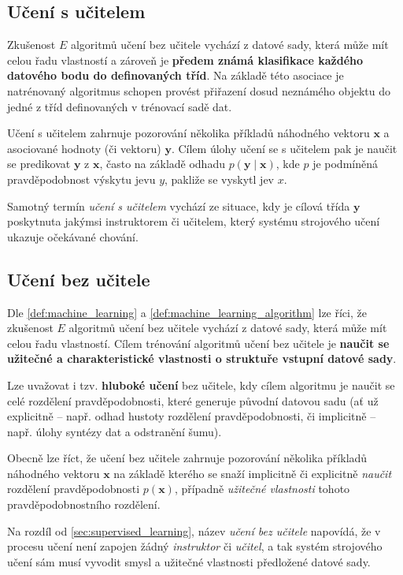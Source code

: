 \subsection{Učení s učitelem}
\label{sec:supervised_learning}
Zkušenost $E$ algoritmů učení bez učitele vychází z datové sady, která může mít celou řadu vlastností a zároveň je \textbf{předem známá klasifikace každého datového bodu do definovaných tříd}.
Na základě této asociace je natrénovaný algoritmus schopen provést přiřazení dosud neznámého objektu do jedné z tříd definovaných v trénovací sadě dat. \cite{Chollet2017}

Učení s učitelem zahrnuje pozorování několika příkladů náhodného vektoru $\mathbf{x}$ a asociované hodnoty (či vektoru) $\mathbf{y}$.
Cílem úlohy učení se s učitelem pak je naučit se predikovat $\mathbf{y}$ z $\mathbf{x}$, často na základě odhadu $p(\mathbf{y}\mid\mathbf{x})$, kde $p$ je podmíněná pravděpodobnost výskytu jevu $y$, pakliže se vyskytl jev $x$. \cite{Goodfellow2016}

Samotný termín \emph{učení s učitelem} vychází ze situace, kdy je cílová třída $\mathbf{y}$ poskytnuta jakýmsi instruktorem či učitelem, který systému strojového učení ukazuje očekávané chování. \cite{Goodfellow2016}
\subsection{Učení bez učitele}
\label{sec:unsupervised_learning}
Dle \autoref{def:machine_learning} a \autoref{def:machine_learning_algorithm} lze říci, že zkušenost $E$ algoritmů učení bez učitele vychází z datové sady, která může mít celou řadu vlastností.
Cílem trénování algoritmů učení bez učitele je \textbf{naučit se užitečné a charakteristické vlastnosti o struktuře vstupní datové sady}.

Lze uvažovat i tzv. \textbf{hluboké učení} bez učitele, kdy cílem algoritmu je naučit se celé rozdělení pravděpodobnosti, které generuje původní datovou sadu (ať už explicitně – např. odhad hustoty rozdělení pravděpodobnosti, či implicitně – např. úlohy syntézy dat a odstranění šumu). \cite{Chollet2017}

Obecně lze říct, že učení bez učitele zahrnuje pozorování několika příkladů náhodného vektoru $\mathbf{x}$ na základě kterého se snaží implicitně či explicitně \emph{naučit} rozdělení pravděpodobnosti $p(\mathbf{x})$, případně \emph{užitečné vlastnosti} tohoto pravděpodobnostního rozdělení.

Na rozdíl od \autoref{sec:supervised_learning}, název \emph{učení bez učitele} napovídá, že v procesu učení není zapojen žádný \emph{instruktor} či \emph{učitel}, a tak systém strojového učení sám musí vyvodit smysl a užitečné vlastnosti předložené datové sady. \cite{Goodfellow2016}
